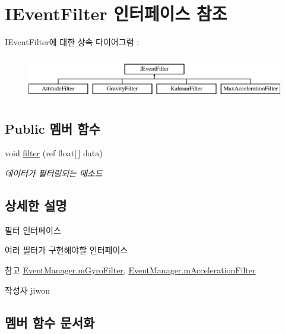 \hypertarget{interface_i_event_filter}{}\section{I\+Event\+Filter 인터페이스 참조}
\label{interface_i_event_filter}
I\+Event\+Filter에 대한 상속 다이어그램 \+: \begin{figure}[H]
\begin{center}
\leavevmode
\includegraphics[height=1.931034cm]{interface_i_event_filter}
\end{center}
\end{figure}
\subsection*{Public 멤버 함수}
\begin{DoxyCompactItemize}
\item 
void \hyperlink{interface_i_event_filter_aa70c90ea957214088b4c4cbb275a6714}{filter} (ref float\mbox{[}$\,$\mbox{]} data)
\begin{DoxyCompactList}\small\item\em 데이터가 필터링되는 매소드 \end{DoxyCompactList}\end{DoxyCompactItemize}


\subsection{상세한 설명}
필터 인터페이스

여러 필터가 구현해야할 인터페이스 \begin{DoxySeeAlso}{참고}
\hyperlink{class_event_manager_a7cee85488f5d7220c102cd945b1f494a}{Event\+Manager.\+m\+Gyro\+Filter}, \hyperlink{class_event_manager_a2e8707f51be09be7f400bd9cca230b3a}{Event\+Manager.\+m\+Acceleration\+Filter} 
\end{DoxySeeAlso}
\begin{DoxyAuthor}{작성자}
jiwon 
\end{DoxyAuthor}


\subsection{멤버 함수 문서화}
\hypertarget{interface_i_event_filter_aa70c90ea957214088b4c4cbb275a6714}{}
